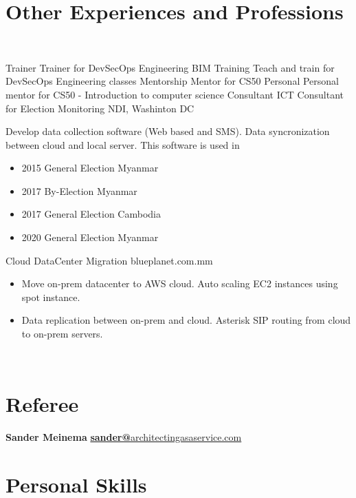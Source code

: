 \documentclass[]{friggeri-cv}
\begin{document}
\section{Other Experiences and Professions}
~
\begin{entrylist}
  \entry
  {Trainer}
  {Trainer for DevSecOps Engineering}
  {BIM Training}
  {Teach and train for DevSecOps Engineering classes}
  \entry
  {Mentorship}
  {Mentor for CS50}
  {Personal}
  {Personal mentor for CS50 - Introduction to computer science}
  \entry
  {Consultant}
  {ICT Consultant for Election Monitoring}
  {NDI, Washinton DC}
  {Develop data collection software (Web based and SMS). Data syncronization between cloud and local server. This software is used in 
    \begin{itemize}
      \item 2015 General Election Myanmar
      \item 2017 By-Election Myanmar
      \item 2017 General Election Cambodia
      \item 2020 General Election Myanmar
    \end{itemize}}
  \entry
  {Cloud}
  {DataCenter Migration}
  {blueplanet.com.mm}
  {
    \begin{itemize}
      \item Move on-prem datacenter to AWS cloud. Auto scaling EC2 instances using spot instance. 
      \item Data replication between on-prem and cloud. Asterisk SIP routing from cloud to on-prem servers.
    \end{itemize}}
\end{entrylist}

\begin{aside}
~
~
~
~
  \section{Referee}
    \textbf{Sander Meinema}
    \href{mailto:sander@architectingasaservice.com}{\textbf{sander@}architectingasaservice.com}
  ~
  \section{Personal Skills}
~
\end{aside}
\end{document}
